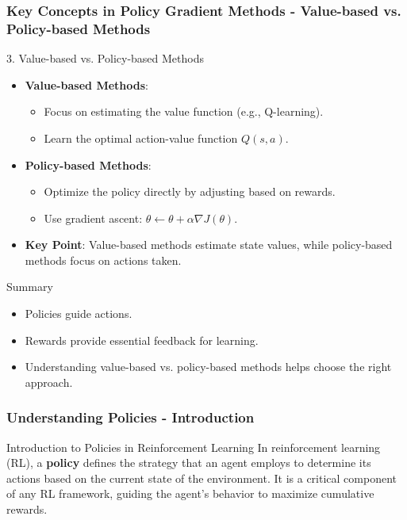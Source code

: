 \documentclass[aspectratio=169]{beamer}
\begin{document}
\begin{frame}[fragile]
    \frametitle{Key Concepts in Policy Gradient Methods - Value-based vs. Policy-based Methods}
    \begin{block}{3. Value-based vs. Policy-based Methods}
        \begin{itemize}
            \item \textbf{Value-based Methods}:
                \begin{itemize}
                    \item Focus on estimating the value function (e.g., Q-learning).
                    \item Learn the optimal action-value function \( Q(s, a) \).
                \end{itemize}
            \item \textbf{Policy-based Methods}:
                \begin{itemize}
                    \item Optimize the policy directly by adjusting based on rewards.
                    \item Use gradient ascent: \( \theta \leftarrow \theta + \alpha \nabla J(\theta) \).
                \end{itemize}
            \item \textbf{Key Point}: Value-based methods estimate state values, while policy-based methods focus on actions taken.
        \end{itemize}
    \end{block}
    \begin{block}{Summary}
        \begin{itemize}
            \item Policies guide actions.
            \item Rewards provide essential feedback for learning.
            \item Understanding value-based vs. policy-based methods helps choose the right approach.
        \end{itemize}
    \end{block}
\end{frame}

\begin{frame}[fragile]
    \frametitle{Understanding Policies - Introduction}
    \begin{block}{Introduction to Policies in Reinforcement Learning}
        In reinforcement learning (RL), a \textbf{policy} defines the strategy that an agent employs to determine its actions based on the current state of the environment. 
        It is a critical component of any RL framework, guiding the agent’s behavior to maximize cumulative rewards.
    \end{block}
\end{frame}
\end{document}
